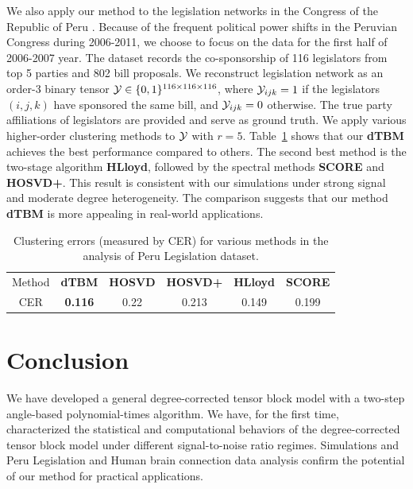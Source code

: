 \documentclass[lettersize,onecolumn,journal]{IEEEtran}
\theoremstyle{definition}
\theoremstyle{definition}
\begin{document}
We also apply our method to the legislation networks in the Congress of the Republic of Peru \citep{lee2017time}. Because of the frequent political power shifts in the Peruvian Congress during 2006-2011, we choose to focus on the data for the first half of 2006-2007 year. The dataset records the co-sponsorship of 116 legislators from top 5 parties and 802 bill proposals. We reconstruct legislation network as an order-3 binary tensor $\mathcal{Y} \in \{0,1\}^{116 \times 116 \times 116}$, where $\mathcal{Y}_{ijk} = 1$ if the legislators $(i,j,k)$ have sponsored the same bill, and $\mathcal{Y}_{ijk} = 0$ otherwise. The true party affiliations of legislators are provided and serve as ground truth. We apply various higher-order clustering methods to $\mathcal{Y}$ with $r = 5$. Table~\ref{tab:peru} shows that our \textbf{\small dTBM} achieves the best performance compared to others. The second best method is the two-stage algorithm \textbf{\small HLloyd}, followed by the spectral methods \textbf{\small SCORE} and \textbf{\small HOSVD+}. This result is consistent with our simulations under strong signal and moderate degree heterogeneity. The comparison suggests that our method \textbf{\small dTBM} is more appealing in real-world applications.

\begin{table}[ht]
    \centering
    \begin{tabular}{c |c  c cc c}
    \hline
        Method & \textbf{\small dTBM} 
        &\textbf{\small HOSVD}
        &\textbf{\small HOSVD+} & \textbf{\small HLloyd} &  \textbf{\small SCORE}\\
         CER & \textbf{0.116}
         &  0.22 
         &0.213 & 0.149 &0.199\\
         \hline
    \end{tabular}
    \caption{Clustering errors (measured by CER) for various methods in the analysis of Peru Legislation dataset.}
    \label{tab:peru}
\end{table}

\section{Conclusion}\label{sec:con}
We have developed a general degree-corrected tensor block model with a two-step angle-based polynomial-times algorithm. We have, for the first time, characterized the statistical and computational behaviors of the degree-corrected tensor block model under different signal-to-noise ratio regimes. Simulations and Peru Legislation and Human brain connection data analysis confirm the potential of our method for practical applications.
\end{document}
